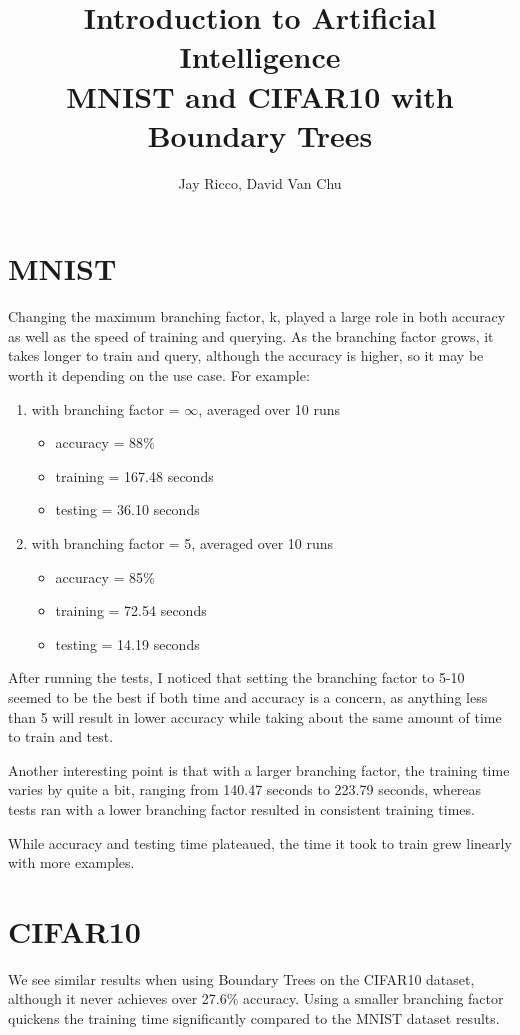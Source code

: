 \documentclass[10pt,letterpaper]{article}
\author{Jay Ricco, David Van Chu}
\title{Introduction to Artificial Intelligence\\MNIST and CIFAR10 with Boundary Trees}
\begin{document}
	\maketitle
	\section{MNIST}
		\hspace{5mm}Changing the maximum branching factor, k, played a large role in both accuracy as well as the speed of training and querying. As the branching factor grows, it takes longer to train and query, although the accuracy is higher, so it may be worth it depending on the use case.
		For example:
			
		\begin{enumerate}	
			\item with branching factor = $\infty$, averaged over 10 runs
				\begin{itemize}
					\item accuracy = 88$\%$
					\item training = 167.48 seconds
					\item testing = 36.10 seconds
				\end{itemize}
	 		\item with branching factor = 5, averaged over 10 runs
				\begin{itemize}
					\item accuracy = 85$\%$
					\item training = 72.54 seconds
					\item testing = 14.19 seconds
				\end{itemize}
			\end{enumerate}
		
		After running the tests, I noticed that setting the branching factor to 5-10 seemed to be the best if both time and accuracy is a concern, as anything less than 5 will result in lower accuracy while taking about the same amount of time to train and test.
		
		Another interesting point is that with a larger branching factor, the training time varies by quite a bit, ranging from 140.47 seconds to 223.79 seconds, whereas tests ran with a lower branching factor resulted in consistent training times.
		
		While accuracy and testing time plateaued, the time it took to train grew linearly with more examples.
		
	\section{CIFAR10}
	\hspace{5mm}We see similar results when using Boundary Trees on the CIFAR10 dataset, although it never achieves over 27.6$\%$ accuracy. Using a smaller branching factor quickens the training time significantly compared to the MNIST dataset results.
	
\end{document}
